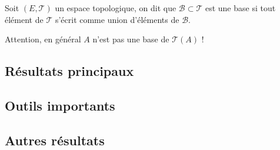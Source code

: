 \documentclass[12pt,a4paper]{article}
\begin{document}
\begin{definstar}
Soit $(E,\mathcal{T})$ un espace topologique, on dit que $\mathcal{B}\subset \mathcal{T}$ est une base si tout élément de $\mathcal{T}$ s'écrit comme union d'éléments de $\mathcal{B}$.
\end{definstar}
\begin{rmq}
Attention, en général $A$ n'est pas une base de $\mathcal{T}(A)$ !
\end{rmq}

\subsection*{Résultats principaux}

\subsection*{Outils importants}

\subsection*{Autres résultats}
\end{document}

